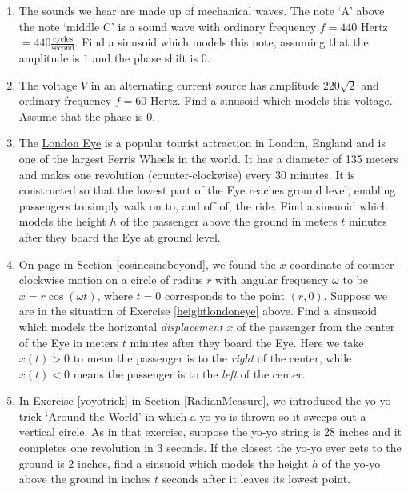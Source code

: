 \documentclass{ximera}
\begin{document}
\begin{enumerate}

\setcounter{enumi}{\value{HW}}

\item  The sounds we hear are made up of mechanical waves.  The note `A' above the note `middle C' is a sound wave with ordinary frequency $f = 440$ Hertz $= 440 \frac{\text{cycles}}{\text{second}}$.  Find a sinusoid which models this note, assuming that the amplitude is $1$ and the phase shift is $0$.

\item The voltage $V$ in an alternating current source has amplitude $220 \sqrt{2}$ and ordinary frequency $f = 60$ Hertz.  Find a sinusoid which models this voltage.  Assume that the phase is $0$.


\item \label{heightlondoneye} The \href{http://en.wikipedia.org/wiki/London_Eye}{\underline{London Eye}} is a popular tourist attraction in London, England and is one of the largest Ferris Wheels in the world.  It has a diameter of 135 meters and makes one revolution (counter-clockwise) every 30 minutes.  It is constructed so that the lowest part of the Eye reaches ground level, enabling passengers to simply walk on to, and off of, the ride.  Find a sinsuoid which models the height $h$ of the passenger above the ground in meters $t$ minutes after they board the Eye at ground level.

\item \label{leftrightlondoneye} On page \pageref{equationsforcircularmotion} in Section \ref{cosinesinebeyond}, we found the $x$-coordinate of counter-clockwise motion on a circle of radius $r$ with angular frequency $\omega$ to be $x = r\cos(\omega t)$, where $t=0$ corresponds to the point $(r,0)$.  Suppose we are in the situation of Exercise \ref{heightlondoneye} above.  Find a sinsusoid which models the horizontal \textit{displacement} $x$ of the passenger from the center of the Eye in meters $t$ minutes after they board the Eye.  Here we take $x(t) > 0$ to mean the passenger is to the \textit{right} of the center, while $x(t) < 0$ means the passenger is to the \textit{left} of the center.

\item  In Exercise \ref{yoyotrick} in Section \ref{RadianMeasure}, we introduced the yo-yo trick `Around the World' in which a yo-yo is thrown so it sweeps out a vertical circle.  As in that exercise, suppose the yo-yo string is 28 inches and it completes one revolution in 3 seconds.  If the closest the yo-yo ever gets to the ground is 2 inches, find a sinsuoid which models the height $h$ of the yo-yo above the ground in inches $t$ seconds after it leaves its lowest point.




\end{enumerate}
\end{document}
